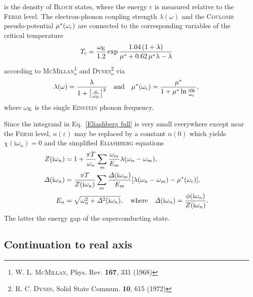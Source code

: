 \documentclass[twocolumn]{article}
\def\I{\mathrm i}
\def\sub#1{\sb{\mathrm{#1}}}
\let\epsilon\varepsilon
\let\Delta\varDelta
\newlength\gap
\let\vol\textbf
\let\name\textsc
\begin{document}
   is  the  density of  \name{Bloch}  states,  where  the energy  $\epsilon$  is
   measured  relative to  the \name{Fermi}  level. The  electron-phonon coupling
   strength   $\lambda(\omega)$   and    the   \name{Coulomb}   pseudo-potential
   $\mu^*(\omega \sub  c)$ are connected  to the corresponding variables  of the
   critical temperature
   \begin{align}
      T \sub c = \frac{\omega \sub E}{1.2}
      \exp \frac{1.04 \, (1 + \lambda)}{\mu^* + 0.62 \, \mu^* \lambda - \lambda}
      \label{TcMD}
   \end{align}
   according  to  \name{McMillan}\footnote{W.  L.  \name{McMillan},  Phys.  Rev.
   \vol{167}, 331  (1968)} and  \name{Dynes}\footnote{R. C.  \name{Dynes}, Solid
   State Commun. \vol{10}, 615 (1972)} via
   \begin{align*}
      \lambda(\omega) = \frac \lambda
      {1 + \big[ \frac \omega {\omega \sub E} \big]^2}
      \quad \text{and} \quad
      \mu^*(\omega \sub c) = \frac {\mu^*}
      {1 + \mu^* \ln \frac{\omega \sub E}{\omega \sub c}},
   \end{align*}
   where $\omega \sub E$ is the single \name{Einstein} phonon frequency.

   Since the  integrand in  Eq.~\ref{Eliashberg full}  is very  small everywhere
   except  near the  \name{Fermi}  level,  $n(\epsilon)$ may  be  replaced by  a
   constant  $n(0)$ which  yields $\chi(\I  \omega_n)  = 0$  and the  simplified
   \name{Eliashberg} equations
   \begin{align}
      \begin{split}
         Z(\I \omega_n) &= 1 + \frac{\pi T}{\omega_n} \sum_m
         \frac{\omega_m}{E_m}
         \lambda(\omega_n - \omega_m),
         \\
         \Delta(\I \omega_n) &= \frac{\pi T}{Z(\I \omega_n)} \sum_m
         \frac{\Delta(\I \omega_m)}{E_m}
         [\lambda(\omega_n - \omega_m) - \mu^*(\omega \sub c)],
         \\
         E_n &= \sqrt{\omega_n^2 + \Delta^2(\I \omega_n)},
         \quad \text{where} \quad
         \Delta(\I \omega_n) = \frac{\phi(\I \omega_n)}{Z(\I \omega_n)}.
      \end{split}
      \label{Eliashberg simple}
   \end{align}
   The latter the energy gap of the superconducting state.

   \subsection{Continuation to real axis}
\end{document}
